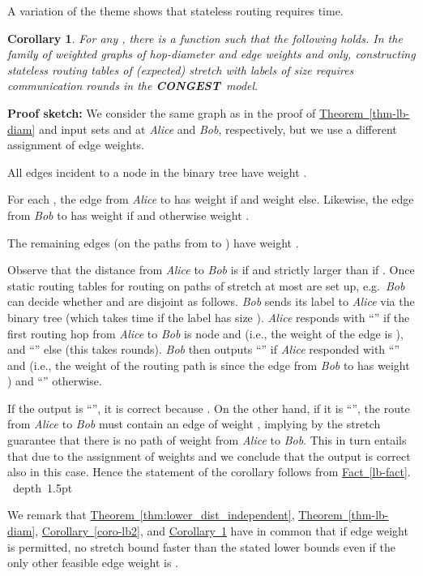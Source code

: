 \documentclass[letterpaper,11pt]{article}
\newcommand{\namedref}[2]{\hyperref[#2]{#1~\ref*{#2}}}
\newcommand{\theoremref}[1]{\namedref{Theorem}{#1}}
\newcommand{\corollaryref}[1]{\namedref{Corollary}{#1}}
\newcommand{\factref}[1]{\namedref{Fact}{#1}}
\newtheorem{corollary}[theorem]{Corollary}
\newcommand{\blackslug}{\hbox{\hskip 1pt \vrule width 4pt height 8pt
depth 1.5pt \hskip 1pt}}
\newcommand{\QED}{\quad\blackslug\lower 8.5pt\null\par}
\newenvironment{proof}[1][Proof:]{\noindent \textbf{#1}\xspace}{\QED}
\newcommand{\CONGEST}{\textbf{CONGEST}}
\begin{document}
A variation of the theme shows that stateless routing requires
 time.

\begin{corollary}\label{coro-lb}
For any , there is a function  such that the following holds. In the family of
weighted graphs of hop-diameter  and edge weights 
and  only, constructing stateless routing
tables of (expected) stretch  with labels of size
 requires  communication rounds in
the \CONGEST\ model.
\end{corollary}
\begin{proof}[Proof sketch:] We consider the same graph as in the proof of
\theoremref{thm-lb-diam} and input sets  and  at \emph{Alice} and
\emph{Bob}, respectively, but we use a different assignment of edge weights.
\begin{compactitem}
  \item All edges incident to a node in the binary tree have weight
  .
  \item For each , the edge from \emph{Alice} to 
  has weight  if  and weight  else. Likewise, the edge
  from \emph{Bob} to  has weight  if  and
  otherwise weight .
  \item The remaining edges (on the  paths from  to ) have
  weight .
\end{compactitem}
Observe that the distance from \emph{Alice} to \emph{Bob} is  if
 and strictly larger than  if . Once static routing tables for routing on paths of stretch at most
 are set up, e.g.\ \emph{Bob} can decide whether 
and  are disjoint as follows. \emph{Bob} sends its label to \emph{Alice} via
the binary tree (which takes time  if the label has size
). \emph{Alice} responds with ``'' if the first
routing hop from \emph{Alice} to \emph{Bob} is node  and  (i.e., the weight of the edge is ), and ``'' else (this
takes  rounds). \emph{Bob} then outputs ``''
if \emph{Alice} responded with ``'' and  (i.e., the weight of the
routing path is  since the edge from \emph{Bob} to  has
weight ) and ``'' otherwise.

If the output is ``'', it is correct because . On the other hand, if it is ``'', the route from
\emph{Alice} to \emph{Bob} must contain an edge of weight ,
implying by the stretch guarantee that there is no path of weight 
from \emph{Alice} to \emph{Bob}. This in turn entails that 
due to the assignment of weights and we conclude that the output is correct also
in this case. Hence the statement of the corollary follows from
\factref{lb-fact}.
\end{proof}
We remark that \theoremref{thm:lower_dist_independent},
\theoremref{thm-lb-diam}, \corollaryref{coro-lb2}, and \corollaryref{coro-lb}
have in common that if edge weight  is permitted, no stretch bound faster
than the stated lower bounds even if the only other feasible edge weight is .
\end{document}
